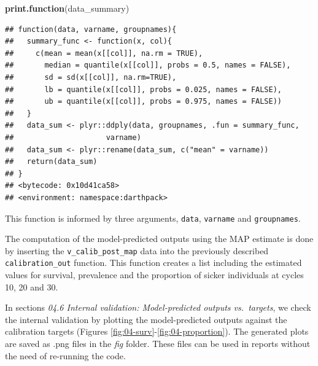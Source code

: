 \documentclass[]{book}
\newenvironment{Shaded}{\begin{snugshade}}{\end{snugshade}}
\newcommand{\KeywordTok}[1]{\textcolor[rgb]{0.13,0.29,0.53}{\textbf{#1}}}
\newcommand{\NormalTok}[1]{#1}
\begin{document}
\begin{Shaded}
\begin{Highlighting}[]
\KeywordTok{print.function}\NormalTok{(data_summary)}
\end{Highlighting}
\end{Shaded}

\begin{verbatim}
## function(data, varname, groupnames){
##   summary_func <- function(x, col){
##     c(mean = mean(x[[col]], na.rm = TRUE),
##       median = quantile(x[[col]], probs = 0.5, names = FALSE),
##       sd = sd(x[[col]], na.rm=TRUE),
##       lb = quantile(x[[col]], probs = 0.025, names = FALSE),
##       ub = quantile(x[[col]], probs = 0.975, names = FALSE))
##   }
##   data_sum <- plyr::ddply(data, groupnames, .fun = summary_func, 
##                     varname)
##   data_sum <- plyr::rename(data_sum, c("mean" = varname))
##   return(data_sum)
## }
## <bytecode: 0x10d41ca58>
## <environment: namespace:darthpack>
\end{verbatim}

This function is informed by three arguments, \texttt{data},
\texttt{varname} and \texttt{groupnames}.

The computation of the model-predicted outputs using the MAP estimate is
done by inserting the \texttt{v\_calib\_post\_map} data into the
previously described \texttt{calibration\_out} function. This function
creates a list including the estimated values for survival, prevalence
and the proportion of sicker individuals at cycles 10, 20 and 30.

In sections \emph{04.6 Internal validation: Model-predicted outputs
vs.~targets}, we check the internal validation by plotting the
model-predicted outputs against the calibration targets (Figures
\ref{fig:04-surv}-\ref{fig:04-proportion}). The generated plots are
saved as .png files in the \emph{fig} folder. These files can be used in
reports without the need of re-running the code.
\end{document}

